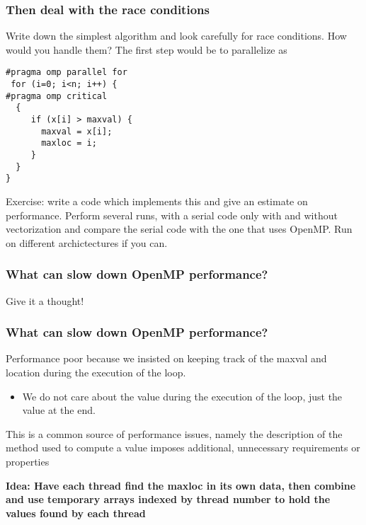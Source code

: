 \documentclass{beamer}
\begin{document}
\begin{frame}
\frametitle{Then deal with the race conditions}

\begin{block}{}
Write down the simplest algorithm and look carefully for race conditions. How would you handle them? 
The first step would be to parallelize as 











\begin{verbatim}
#pragma omp parallel for
 for (i=0; i<n; i++) {
#pragma omp critical
  {
     if (x[i] > maxval) {
       maxval = x[i];
       maxloc = i; 
     }
  }
} 

\end{verbatim}


Exercise: write a code which implements this and give an estimate on performance. Perform several runs,
with a serial code only with and without vectorization and compare the serial code with the one that  uses OpenMP. Run on different archictectures if you can. 
\end{block}
\end{frame}

\begin{frame}
\frametitle{What can slow down OpenMP performance?}

Give it a thought!
\end{frame}

\begin{frame}
\frametitle{What can slow down OpenMP performance?}

\begin{block}{}
Performance poor because we insisted on keeping track of the maxval and location during the execution of the loop.
\begin{itemize}
 \item We do not care about the value during the execution of the loop, just the value at the end.
\end{itemize}

\noindent
This is a common source of performance issues, namely the description of the method used to compute a value imposes additional, unnecessary requirements or properties

\textbf{Idea: Have each thread find the maxloc in its own data, then combine and use temporary arrays indexed by thread number to hold the values found by each thread}
\end{block}
\end{frame}
\end{document}
